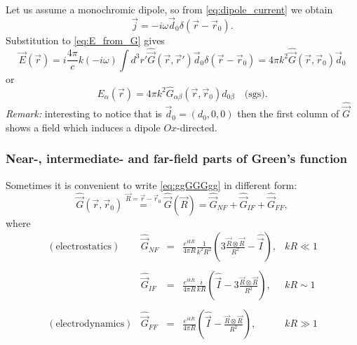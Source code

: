 \begin{testexample}
	Let us assume a monochromic dipole, so from \eqref{eq:dipole_current} we obtain
	\begin{equation}
		\vec{j} = -i\omega \vec{d}_0 \delta(\vec{r} - \vec{r}_0).
	\end{equation}
	Substitution to \eqref{eq:E_from_G} gives
	\begin{equation}
		\vec{E}(\vec{r}) = i \frac{4\pi}{c}k (-i\omega) \int d^3 r' \hat{\vec{G}}(\vec{r}, \vec{r}') \vec{d}_0 \delta(\vec{r} - \vec{r}_0) = 4\pi k^2 \hat{\vec{G}}(\vec{r}, \vec{r}_0) \vec{d}_0
	\end{equation}
	or
	\begin{equation}
		E_{\alpha}(\vec{r}) = 4\pi k^2  \hat{G}_{\alpha \beta}(\vec{r}, \vec{r}_0) d_{0 \beta} \quad \text{(sgs)}.
	\end{equation}
	\textit{Remark:} interesting to notice that is $\vec{d}_0 = (d_0,0,0)$ then the first column of $\hat{\vec{G}}$ shows a field which induces a dipole $Ox$-directed.
\end{testexample}

\subsubsection{Near-, intermediate- and far-field parts of Green's function}

Sometimes it is convenient to write  \eqref{eq:ggGGGgg} in different form:
\begin{equation}
	\hat{\vec{G}}(\vec{r}, \vec{r}_0) \overset{\vec{R} = \vec{r} - \vec{r}_0}{=} \hat{\vec{G}}(\vec{R}) = \hat{\vec{G}}_{NF} + \hat{\vec{G}}_{IF} + \hat{\vec{G}}_{FF},
\end{equation}
where
\begin{equation*}
	\begin{matrix}
		(\text{electrostatics}) & \hat{\vec{G}}_{NF} &=& \frac{e^{ikR}}{4\pi R} \frac{1}{k^2R^2} \left( 3 \frac{\vec{R}\otimes\vec{R}}{R^2} - \hat{\vec{I}} \right), & kR \ll 1 \\ \\
		& \hat{\vec{G}}_{IF} &=& \frac{e^{ikR}}{4\pi R} \frac{i}{kR}  \left( \hat{\vec{I}} - 3\frac{\vec{R}\otimes\vec{R}}{R^2} \right), & kR \sim 1 \\ \\
		(\text{electrodynamics})& \hat{\vec{G}}_{FF} &=& \frac{e^{ikR}}{4\pi R}  \left( \hat{\vec{I}} - \frac{\vec{R}\otimes\vec{R}}{R^2} \right), & kR \gg 1
	\end{matrix}
\end{equation*}
